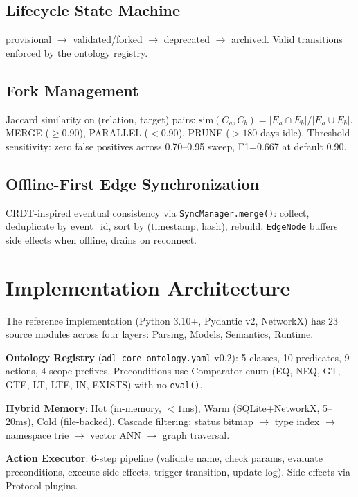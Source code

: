 \documentclass[11pt,a4paper]{article}
\theoremstyle{remark}
\begin{document}
\subsection{Lifecycle State Machine}

provisional $\to$ validated/forked $\to$ deprecated $\to$ archived. Valid transitions enforced by the ontology registry.

\subsection{Fork Management}

Jaccard similarity on (relation, target) pairs: $\mathrm{sim}(C_a, C_b) = |E_a \cap E_b| / |E_a \cup E_b|$. MERGE ($\geq 0.90$), PARALLEL ($<0.90$), PRUNE ($>180$ days idle). Threshold sensitivity: zero false positives across 0.70--0.95 sweep, F1=0.667 at default 0.90.

\subsection{Offline-First Edge Synchronization}

CRDT-inspired eventual consistency via \texttt{SyncManager.merge()}: collect, deduplicate by event\_id, sort by (timestamp, hash), rebuild. \texttt{EdgeNode} buffers side effects when offline, drains on reconnect.

\section{Implementation Architecture}
\label{sec:impl}

The reference implementation (Python 3.10+, Pydantic v2, NetworkX) has 23 source modules across four layers: Parsing, Models, Semantics, Runtime.

\textbf{Ontology Registry} (\texttt{adl\_core\_ontology.yaml} v0.2): 5 classes, 10 predicates, 9 actions, 4 scope prefixes. Preconditions use Comparator enum (EQ, NEQ, GT, GTE, LT, LTE, IN, EXISTS) with no \texttt{eval()}.

\textbf{Hybrid Memory}: Hot (in-memory, $<1$ms), Warm (SQLite+NetworkX, 5--20ms), Cold (file-backed). Cascade filtering: status bitmap $\to$ type index $\to$ namespace trie $\to$ vector ANN $\to$ graph traversal.

\textbf{Action Executor}: 6-step pipeline (validate name, check params, evaluate preconditions, execute side effects, trigger transition, update log). Side effects via Protocol plugins.
\end{document}
